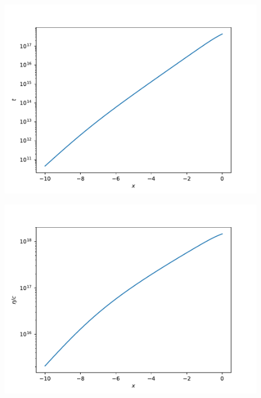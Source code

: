 \documentclass{aa}
\begin{document}
\begin{figure}[ht]
\centering
\includegraphics[width=\hsize]{figures/t.pdf}
  \caption{}
     \label{}
\end{figure}

\begin{figure}[ht]
\centering
\includegraphics[width=\hsize]{figures/eta_over_c.pdf}
  \caption{}
     \label{}
\end{figure}
\end{document}
